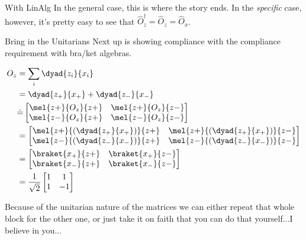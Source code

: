 \begin{answer}
\begin{answerpart}{With LinAlg}
    In the general case, this is where the story ends.  In the
    \emph{specific} case, however, it's pretty easy to see that
    $\hat{O}_z^\dagger = \hat{O}_z = \hat{O}_x$.
    
  \end{answerpart}

  \begin{answerpart}{Bring in the Unitarians}
    Next up is showing compliance with the compliance requirement with
    bra/ket algebras.

    \begin{equation}
      \begin{split}
        O_z
        &= \sum_i \dyad{z_i}{x_i}\\
        &= \dyad{z_+}{x_+} + \dyad{z_-}{x_-}\\
        &\dot{=}
        \begin{bmatrix}
          \mel{z+}{O_z}{z+} & \mel{z+}{O_z}{z-}\\
          \mel{z-}{O_z}{z+} & \mel{z-}{O_z}{z-}\\
        \end{bmatrix}
        \\
        &=
        \begin{bmatrix}
          \mel{z+}{(\dyad{z_+}{x_+})}{z+} & \mel{z+}{(\dyad{z_+}{x_+})}{z-}\\
          \mel{z-}{(\dyad{z_-}{x_-})}{z+} & \mel{z-}{(\dyad{z_-}{x_-})}{z-}\\
        \end{bmatrix}
        \\
        &=
        \begin{bmatrix}
          \braket{x_+}{z+} & \braket{x_+}{z-}\\
          \braket{x_-}{z+} & \braket{x_-}{z-}\\
        \end{bmatrix}
        \\
        &=
        \frac{1}{\sqrt{2}}
        \begin{bmatrix}
          1 & 1\\
          1 & -1\\
        \end{bmatrix}
        \\
      \end{split}
    \end{equation}

    Because of the unitarian nature of the matrices we can either
    repeat that whole block for the other one, or just take it on
    faith that you can do that yourself...I believe in you...
    
  \end{answerpart}

\end{answer}
